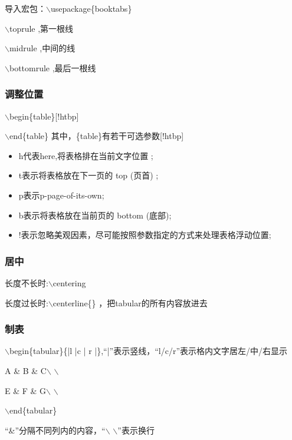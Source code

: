 \documentclass{article}
\begin{document}
导入宏包：$\backslash$usepackage\{booktabs\} 

$\backslash$toprule ,第一根线

    $\backslash$midrule  ,中间的线
    
    $\backslash$bottomrule ,最后一根线

\subsubsection{调整位置}
$\backslash$begin\{table\}[!htbp]

$\backslash$end\{table\}
其中，\{table\}有若干可选参数[!htbp]
\begin{itemize}
    \item h代表here,将表格排在当前文字位置 ;
    \item t表示将表格放在下一页的 top (页首) ;
    \item p表示p-page-of-its-own;
    \item b表示将表格放在当前页的 bottom (底部);
    \item !表示忽略美观因素，尽可能按照参数指定的方式来处理表格浮动位置;
\end{itemize}

\subsubsection{居中}
长度不长时:$\backslash$centering

长度过长时:$\backslash$centerline\{\} ，把tabular的所有内容放进去                      

\subsubsection{制表}



$\backslash$begin\{tabular\}\{|l |c | r |\},“|”表示竖线，“l/c/r”表示格内文字居左/中/右显示

A \& B \& C$\backslash$ $\backslash$               

E \& F \& G$\backslash$ $\backslash$   

$\backslash$end\{tabular\}

“\&”分隔不同列内的内容，“$\backslash$ $\backslash$”表示换行
\end{document}
